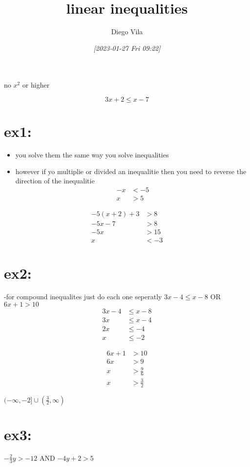 \documentclass[11pt]{article}
\author{Diego Vila}
\date{\textit{[2023-01-27 Fri 09:22]}}
\title{linear inequalities}
\begin{document}
\maketitle
\tableofcontents

no \(x^2\) or higher

\begin{equation*}
3x + 2 \leq x - 7
\end{equation*}

\section{ex1:}
\label{sec:orge7c45a3}
\begin{itemize}
\item you solve them the same way you solve inequalities
\item however if yo multiplie or divided an inequalitie then you need to reverse the direction of the inequalitie
\begin{align*}
-x &< -5\\
x  &> 5
\end{align*}
\end{itemize}


\begin{align*}
-5(x + 2) + 3 &> 8\\
-5x - 7 &> 8\\
-5x &> 15\\
x &< -3
\end{align*}

\section{ex2:}
\label{sec:org2612847}
-for compound inequalites just do each one seperatly 
\(3x - 4 \leq x - 8\) OR \(6x + 1 > 10\)
\begin{align*}
3x - 4 &\leq x - 8\\
3x &\leq x -4\\
2x &\leq -4\\
x &\leq -2
\end{align*}

\begin{align*}
6x + 1 &> 10\\
6x &> 9\\
x &> \frac{9}{6}\\
x &> \frac{3}{2}
\end{align*}

\((-\infty, -2] \cup (\frac{3}{2}, \infty)\)

\section{ex3:}
\label{sec:org88a6998}
\(-\frac{2}{3}y > -12\) AND \(-4y + 2 > 5\)
\end{document}
